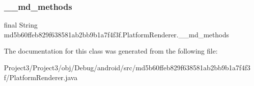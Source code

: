 \subsubsection{\texorpdfstring{\+\_\+\+\_\+md\+\_\+methods}{\_\_md\_methods}}
{\footnotesize\ttfamily final String md5b60ffeb829f638581ab2bb9b1a7f4f3f.\+Platform\+Renderer.\+\_\+\+\_\+md\+\_\+methods\hspace{0.3cm}{\ttfamily [static]}}



The documentation for this class was generated from the following file\+:\begin{DoxyCompactItemize}
\item 
Project3/\+Project3/obj/\+Debug/android/src/md5b60ffeb829f638581ab2bb9b1a7f4f3f/Platform\+Renderer.\+java\end{DoxyCompactItemize}
